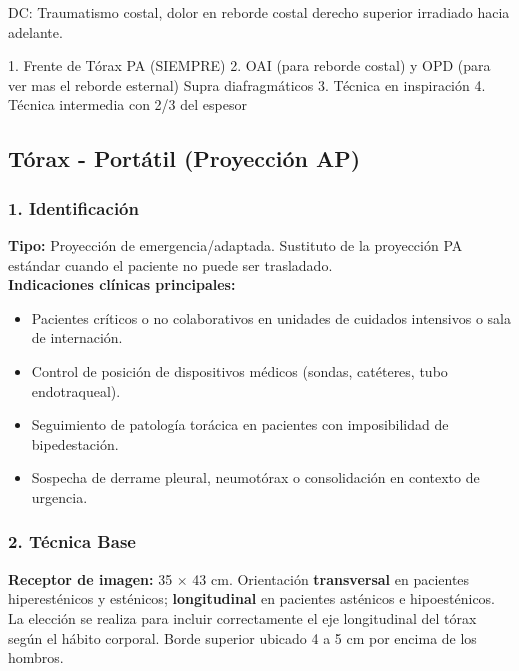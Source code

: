 DC: Traumatismo costal, dolor en reborde costal derecho superior irradiado hacia adelante.

1. Frente de Tórax PA (SIEMPRE)
2. OAI (para reborde costal) y OPD (para ver mas el reborde esternal) Supra diafragmáticos
3. Técnica en inspiración
4. Técnica intermedia con 2/3 del espesor

\clearpage


\subsection{Tórax - Portátil (Proyección AP)}

\subsubsection*{1. Identificación}
\textbf{Tipo:} Proyección de emergencia/adaptada. Sustituto de la proyección PA estándar cuando el paciente no puede ser trasladado.\\

\textbf{Indicaciones clínicas principales:}

\begin{itemize}
  \item Pacientes críticos o no colaborativos en unidades de cuidados intensivos o sala de internación.
  \item Control de posición de dispositivos médicos (sondas, catéteres, tubo endotraqueal).
  \item Seguimiento de patología torácica en pacientes con imposibilidad de bipedestación.
  \item Sospecha de derrame pleural, neumotórax o consolidación en contexto de urgencia.
\end{itemize}

\subsubsection*{2. Técnica Base}

\textbf{Receptor de imagen:} 35 × 43 cm. Orientación \textbf{transversal} en pacientes hiperesténicos y esténicos; \textbf{longitudinal} en pacientes asténicos e hipoesténicos. La elección se realiza para incluir correctamente el eje longitudinal del tórax según el hábito corporal. Borde superior ubicado 4 a 5 cm por encima de los hombros.

